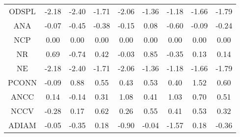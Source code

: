 \documentclass[11pt,a4paper]{report}
\begin{document}
\begin{longtable}{ | c || c | c | c | c | c | c | c || c |}
ODSPL &  \cellcolor[HTML]{FFC7C7} -2.18 &  \cellcolor[HTML]{FFBFBF} -2.40 &  \cellcolor[HTML]{FFD7D7} -1.71 &  \cellcolor[HTML]{FFCFCF} -2.06 &  \cellcolor[HTML]{FFDFDF} -1.36 &  \cellcolor[HTML]{FFDFDF} -1.18 &  \cellcolor[HTML]{FFD7D7} -1.66 &  \cellcolor[HTML]{FFCFCF} -1.79 \\
ANA &  \cellcolor[HTML]{FFFFFF} -0.07 &  \cellcolor[HTML]{FFF7F7} -0.45 &  \cellcolor[HTML]{FFF7F7} -0.38 &  \cellcolor[HTML]{FFFFFF} -0.15 &  \cellcolor[HTML]{FFFFFF} 0.08 &  \cellcolor[HTML]{FFEFEF} -0.60 &  \cellcolor[HTML]{FFFFFF} -0.09 &  \cellcolor[HTML]{FFF7F7} -0.24 \\
NCP &  \cellcolor[HTML]{FFFFFF} 0.00 &  \cellcolor[HTML]{FFFFFF} 0.00 &  \cellcolor[HTML]{FFFFFF} 0.00 &  \cellcolor[HTML]{FFFFFF} 0.00 &  \cellcolor[HTML]{FFFFFF} 0.00 &  \cellcolor[HTML]{FFFFFF} 0.00 &  \cellcolor[HTML]{FFFFFF} 0.00 &  \cellcolor[HTML]{FFFFFF} 0.00 \\
NR &  \cellcolor[HTML]{EFEFFF} 0.69 &  \cellcolor[HTML]{FFEFEF} -0.74 &  \cellcolor[HTML]{F7F7FF} 0.42 &  \cellcolor[HTML]{FFFFFF} -0.03 &  \cellcolor[HTML]{E7E7FF} 0.85 &  \cellcolor[HTML]{FFF7F7} -0.35 &  \cellcolor[HTML]{FFFFFF} 0.13 &  \cellcolor[HTML]{FFFFFF} 0.14 \\
NE &  \cellcolor[HTML]{FFC7C7} -2.18 &  \cellcolor[HTML]{FFBFBF} -2.40 &  \cellcolor[HTML]{FFD7D7} -1.71 &  \cellcolor[HTML]{FFCFCF} -2.06 &  \cellcolor[HTML]{FFDFDF} -1.36 &  \cellcolor[HTML]{FFDFDF} -1.18 &  \cellcolor[HTML]{FFD7D7} -1.66 &  \cellcolor[HTML]{FFCFCF} -1.79 \\
PCONN &  \cellcolor[HTML]{FFFFFF} -0.09 &  \cellcolor[HTML]{E7E7FF} 0.88 &  \cellcolor[HTML]{EFEFFF} 0.55 &  \cellcolor[HTML]{F7F7FF} 0.43 &  \cellcolor[HTML]{EFEFFF} 0.53 &  \cellcolor[HTML]{F7F7FF} 0.40 &  \cellcolor[HTML]{D7D7FF} 1.52 &  \cellcolor[HTML]{EFEFFF} 0.60 \\
ANCC &  \cellcolor[HTML]{FFFFFF} 0.14 &  \cellcolor[HTML]{FFFFFF} -0.14 &  \cellcolor[HTML]{F7F7FF} 0.31 &  \cellcolor[HTML]{E7E7FF} 1.08 &  \cellcolor[HTML]{F7F7FF} 0.41 &  \cellcolor[HTML]{E7E7FF} 1.03 &  \cellcolor[HTML]{EFEFFF} 0.70 &  \cellcolor[HTML]{EFEFFF} 0.51 \\
NCCV &  \cellcolor[HTML]{FFF7F7} -0.28 &  \cellcolor[HTML]{F7F7FF} 0.17 &  \cellcolor[HTML]{EFEFFF} 0.62 &  \cellcolor[HTML]{F7F7FF} 0.26 &  \cellcolor[HTML]{EFEFFF} 0.55 &  \cellcolor[HTML]{F7F7FF} 0.41 &  \cellcolor[HTML]{EFEFFF} 0.53 &  \cellcolor[HTML]{F7F7FF} 0.32 \\
ADIAM &  \cellcolor[HTML]{FFFFFF} -0.05 &  \cellcolor[HTML]{FFF7F7} -0.35 &  \cellcolor[HTML]{F7F7FF} 0.18 &  \cellcolor[HTML]{FFE7E7} -0.90 &  \cellcolor[HTML]{FFFFFF} -0.04 &  \cellcolor[HTML]{FFD7D7} -1.57 &  \cellcolor[HTML]{F7F7FF} 0.18 &  \cellcolor[HTML]{FFF7F7} -0.36 \\

\end{longtable}
\end{document}
